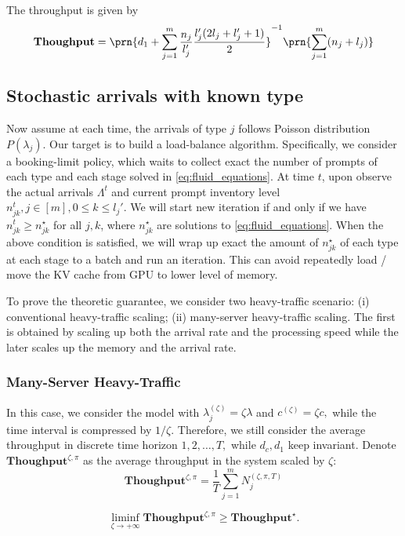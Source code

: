 \documentclass[opre, nonblindrev]{informs3} %
\newcommand{\throughput}{\textbf{Thoughput}}
\begin{document}
The throughput is given by 
\begin{equation}
    \throughput = \prn{d_1+ \sum_{j=1}^m \frac{n_j}{l_j'}\frac{l_j'(2l_j+l_j'+1)}{2}}^{-1}\prn{\sum_{j=1}^m(n_j+l_j)}
\end{equation}

\subsection{Stochastic arrivals with known type}
Now assume at each time, the arrivals of type $j$ follows Poisson distribution $P(\lambda_j)$. Our target is to build a load-balance algorithm. Specifically, we consider a booking-limit policy, which waits to collect exact the number of prompts of each type and each stage solved in \eqref{eq:fluid_equations}. At time $t$, upon observe the actual arrivals $\Lambda^t$ and current prompt inventory level $n_{jk}^t,j\in[m],0\le k\le l_j'.$ We will start new iteration if and only if we have $n_{jk}^t \ge n_{jk}^\star$ for all $j,k$, where $n_{jk}^\star$ are solutions to \eqref{eq:fluid_equations}. When the above condition is satisfied, we will wrap up exact the amount of $n_{jk}^\star$ of each type at each stage to a batch and run an iteration. This can avoid repeatedly load / move the KV cache from GPU to lower level of memory.

To prove the theoretic guarantee, we consider two heavy-traffic scenario: (i) conventional heavy-traffic scaling; (ii) many-server heavy-traffic scaling. The first is obtained by scaling up both the arrival rate and the processing speed while the later scales up the memory and the arrival rate.

\subsubsection{Many-Server Heavy-Traffic}
In this case, we consider the model with $\lambda_j^{(\zeta)} = \zeta\lambda$ and $c^{(\zeta)} = \zeta c,$ while the time interval is compressed by $1/\zeta.$ Therefore, we still consider the average throughput in discrete time horizon $1,2,\dots,T,$ while $d_c,d_1$ keep invariant. Denote $\throughput^{\zeta,\pi}$ as the average throughput in the system scaled by $\zeta$:
\begin{equation*}
    \throughput^{\zeta,\pi} = \frac{1}{T}\sum_{j=1}^m N_j^{(\zeta,\pi,T)}
\end{equation*}
\begin{theorem}
    \label{thm:many_server}
    \begin{equation*}
        \liminf_{\zeta\to+\infty} \throughput^{\zeta,\pi} \ge \throughput^\star.
    \end{equation*}
\end{theorem}
\end{document}
